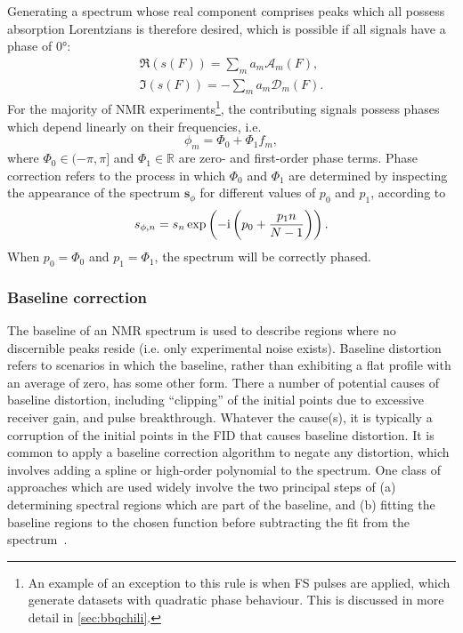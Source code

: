 Generating a spectrum whose real component comprises peaks which all possess
absorption Lorentzians is therefore desired, which is possible if all signals
have a phase of \ang{0}:
\begin{subequations}
    \begin{gather}
        \Re(s(F)) = \sum_m a_m \mathcal{A}_m(F),\label{eq:absorption}\\
        \Im(s(F)) = -\sum_m a_m \mathcal{D}_m(F).\label{eq:dispersion}
    \end{gather}
\end{subequations}
For the majority of \ac{NMR} experiments\footnote{
     An example of an exception to this rule is when \acl{FS} pulses are applied,
     which generate datasets with quadratic phase behaviour. This is discussed
     in more detail in \cref{sec:bbqchili}.
}, the contributing signals possess phases which depend linearly on their
frequencies, i.e.
\begin{equation}
    \phi_m = \Phi_0 + \Phi_1 f_m,
\end{equation}
where $\Phi_0 \in (-\pi, \pi]$ and $\Phi_1 \in \mathbb{R}$ are zero- and
first-order phase terms.
Phase correction refers to the process in which $\Phi_0$ and $\Phi_1$ are
determined by inspecting the appearance of the spectrum
$\symbf{s}_{\phi}$ for different values of $p_0$ and  $p_1$, according to
\begin{equation}
    s_{\phi,n} = s_n
    \exp\left(-\mathrm{i} \left(p_0 + \frac{p_1 n}{N - 1}\right)\right).
\end{equation}
When $p_0 = \Phi_0$ and  $p_1 = \Phi_1$, the spectrum will be correctly phased.

\subsubsection{Baseline correction}
The baseline of an \ac{NMR} spectrum is used to describe regions where
no discernible peaks reside (i.e. only experimental noise exists).
Baseline distortion refers to scenarios in which the baseline, rather
than exhibiting a flat profile with an average of zero, has some other form.
There a number of potential causes of baseline distortion, including
``clipping'' of the initial points due to excessive receiver gain,
and pulse breakthrough.
Whatever the cause(s), it is typically a corruption of the initial points in
the \ac{FID} that causes baseline distortion.
It is common to apply a baseline correction algorithm to negate any distortion,
which involves adding a spline or high-order polynomial to the spectrum.
One class of approaches which are used widely involve the two principal steps
of (a) determining spectral regions which are part of the baseline, and (b)
fitting the baseline regions to the chosen
function before subtracting the fit from the
spectrum~\cite{Dietrich1991,Cobas2006}.


